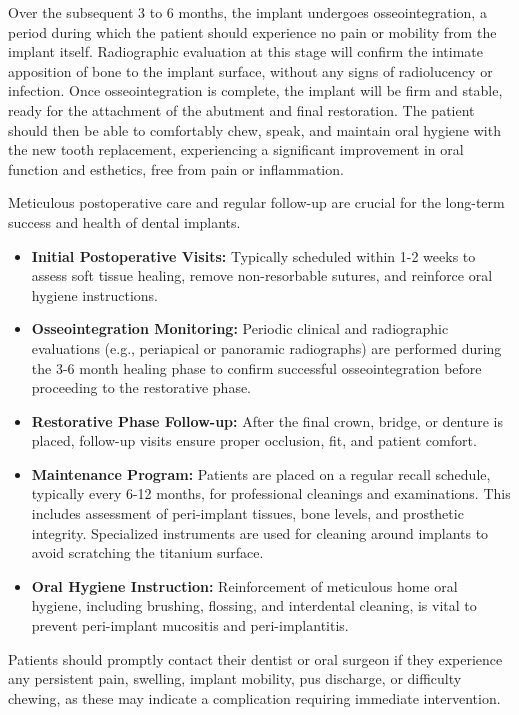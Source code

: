 Over the subsequent 3 to 6 months, the implant undergoes osseointegration, a period during which the patient should experience no pain or mobility from the implant itself. Radiographic evaluation at this stage will confirm the intimate apposition of bone to the implant surface, without any signs of radiolucency or infection. Once osseointegration is complete, the implant will be firm and stable, ready for the attachment of the abutment and final restoration. The patient should then be able to comfortably chew, speak, and maintain oral hygiene with the new tooth replacement, experiencing a significant improvement in oral function and esthetics, free from pain or inflammation.

Meticulous postoperative care and regular follow-up are crucial for the long-term success and health of dental implants.

\begin{itemize}
  \item \textbf{Initial Postoperative Visits:} Typically scheduled within 1-2 weeks to assess soft tissue healing, remove non-resorbable sutures, and reinforce oral hygiene instructions.
  
  \item \textbf{Osseointegration Monitoring:} Periodic clinical and radiographic evaluations (e.g., periapical or panoramic radiographs) are performed during the 3-6 month healing phase to confirm successful osseointegration before proceeding to the restorative phase.
  
  \item \textbf{Restorative Phase Follow-up:} After the final crown, bridge, or denture is placed, follow-up visits ensure proper occlusion, fit, and patient comfort.
  
  \item \textbf{Maintenance Program:} Patients are placed on a regular recall schedule, typically every 6-12 months, for professional cleanings and examinations. This includes assessment of peri-implant tissues, bone levels, and prosthetic integrity. Specialized instruments are used for cleaning around implants to avoid scratching the titanium surface.
  
  \item \textbf{Oral Hygiene Instruction:} Reinforcement of meticulous home oral hygiene, including brushing, flossing, and interdental cleaning, is vital to prevent peri-implant mucositis and peri-implantitis.
\end{itemize}

Patients should promptly contact their dentist or oral surgeon if they experience any persistent pain, swelling, implant mobility, pus discharge, or difficulty chewing, as these may indicate a complication requiring immediate intervention.

